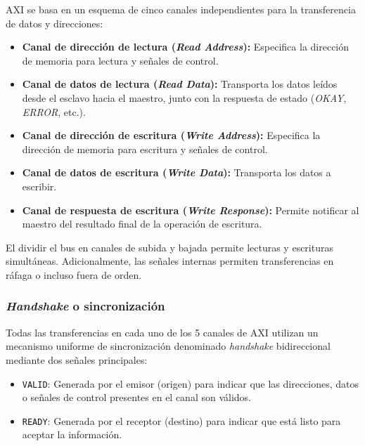 \documentclass[../main.tex]{subfiles}
\begin{document}
            AXI se basa en un esquema de cinco canales independientes para la transferencia de datos y direcciones:
            \begin{itemize}
                \item \textbf{Canal de dirección de lectura (\emph{Read Address}):} Especifica la dirección de memoria para lectura y señales de control.
                \item \textbf{Canal de datos de lectura (\emph{Read Data}):} Transporta los datos leídos desde el esclavo hacia el maestro, junto con la respuesta de estado (\emph{OKAY}, \emph{ERROR}, etc.).
                \item \textbf{Canal de dirección de escritura (\emph{Write Address}):} Especifica la dirección de memoria para escritura y señales de control.
                \item \textbf{Canal de datos de escritura (\emph{Write Data}):} Transporta los datos a escribir.
                \item \textbf{Canal de respuesta de escritura (\emph{Write Response}):} Permite notificar al maestro del resultado final de la operación de escritura.
            \end{itemize}

            El dividir el bus en canales de subida y bajada permite lecturas y escrituras simultáneas. Adicionalmente, las señales internas permiten transferencias en ráfaga o incluso fuera de orden.

            \subsubsection{\emph{Handshake} o sincronización}

                Todas las transferencias en cada uno de los 5 canales de AXI utilizan un mecanismo uniforme de sincronización denominado \emph{handshake} bidireccional mediante dos señales principales:

                \begin{itemize}
                    \item \texttt{VALID}: Generada por el emisor (origen) para indicar que las direcciones, datos o señales de control presentes en el canal son válidos.
                    \item \texttt{READY}: Generada por el receptor (destino) para indicar que está listo para aceptar la información.
                \end{itemize}
\end{document}
